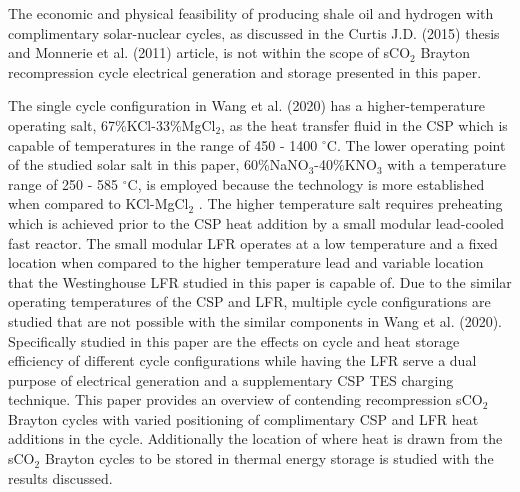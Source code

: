 The economic and physical feasibility of producing shale oil and hydrogen with complimentary solar-nuclear cycles, as discussed in the Curtis J.D. (2015) thesis and Monnerie et al. (2011) article, is not within the scope of sCO$_2$ Brayton recompression cycle electrical generation and storage presented in this paper.

The single cycle configuration in Wang et al. (2020) has a higher-temperature operating salt, 67\%KCl-33\%MgCl$_2$, as the heat transfer fluid in the CSP which is capable of temperatures in the range of 450 - 1400 $^{\circ}$C. The lower operating point of the studied solar salt in this paper, 60\%NaNO$_3$-40\%KNO$_3$ with a temperature range of 250 - 585 $^{\circ}$C, is employed because the technology is more established when compared to KCl-MgCl$_2$ \cite{turchi_2018}. The higher temperature salt requires preheating which is achieved prior to the CSP heat addition by a small modular lead-cooled fast reactor. The small modular LFR operates at a low temperature and a fixed location when compared to the higher temperature lead and variable location that the Westinghouse LFR studied in this paper is capable of. Due to the similar operating temperatures of the CSP and LFR, multiple cycle configurations are studied that are not possible with the similar components in Wang et al. (2020). Specifically studied in this paper are the effects on cycle and heat storage efficiency of different cycle configurations while having the LFR serve a dual purpose of electrical generation and a supplementary CSP TES charging technique. This paper provides an overview of contending recompression sCO$_2$ Brayton cycles with varied positioning of complimentary CSP and LFR heat additions in the cycle. Additionally the location of where heat is drawn from the sCO$_2$ Brayton cycles to be stored in thermal energy storage is studied with the results discussed.



